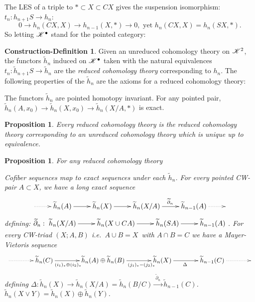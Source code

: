 \documentclass[11pt]{article}
\theoremstyle{plain}
\newtheorem{prop}[thm]{Proposition}
\theoremstyle{definition}
\newtheorem{condef}[thm]{Construction-Definition}
\begin{document}
{\noindent The LES of a triple to $*\subset X\subset CX$ gives the
suspension isomorphism: $t_n:h_{n+1}S\to h_n$:
\[0\to h_n(CX,X)\to h_{n-1}(X,*)\to0,\text{ \ yet \ }h_{n}(CX,X)=h_{n}(SX,*).\]
So letting $\mathscr{K}^\bullet$ stand for the pointed category:
\setcounter{thm}{3}
\begin{condef}
Given an unreduced cohomology theory on $\mathscr{K}^2$, the functors $\widetilde h_n$
induced on $\mathscr{K}^\bullet$ taken with the natural equivalences $t_n:\widetilde
h_{n+1}S\to\widetilde h_n$ are the \emph{reduced cohomology theory}
corresponding to $h_n$. The following properties of the $\widetilde h_n$ are the
axioms for a reduced cohomology theory:
\begin{itemise}
\itm The functors $\widetilde h_n$ are pointed homotopy invariant.
\itm For any pointed pair, 
$\widetilde h_n(A,x_0)\to\widetilde h_n(X,x_0)\to\widetilde h_n(X/A,*)$
is exact.
\end{itemise}
\end{condef}
\setcounter{thm}{5}
\begin{prop}
Every reduced cohomology theory is the reduced cohomology theory corresponding
to an unreduced cohomology theory which is unique up to equivalence.
\end{prop}
\begin{prop} For any reduced cohomology theory\upcol
\begin{itemise}
\itm Cofiber sequences map to exact sequences under each $\widetilde h_n$.
\itm For every pointed CW-pair $A\subset X$, we have a long exact sequence\upcol
\[\xymatrix{
\ar@{.>}[r]&
\widetilde h_n(A)\ar[r]&\widetilde h_{n}(X)\ar[r]&\widetilde h_{n}(X/A)
\ar[r]^{\widetilde\partial_n}&\widetilde h_{n-1}(A)\ar@{.>}[r]&
}\]
defining: $\widetilde\partial_n:\xymatrix{\widetilde h_n(X/A)\ar[r]&
\widetilde h_n(X\cup CA)\ar[r]&\widetilde h_n(SA)\ar[r]&\widetilde h_{n-1}(A)}$.
\itm For every CW-triad $(X;A,B)$ \lparen i.e.\ $A\cup B=X$\rparen\ with $A\cap
B=C$ we have a Mayer-Vietoris sequence\upcol
\[\xymatrix@C=1.3cm{
\ar@{.>}[r]&
\widetilde h_{n}(C)\ar[r]_{(i_1)_*\oplus (i_2)_*\ \ \ \ \ }&
\widetilde h_{n}(A)\oplus \widetilde h_n(B)\ar[r]_{\qquad \ \ (j_1)_*-(j_2)_*}&
\widetilde h_{n}(X)\ar[r]_{\Delta\ \ }&\widetilde h_{n-1}(C)\ar@{.>}[r]&
}\]
defining $\Delta:\widetilde h_n(X)\to \widetilde h_n(X/A)=\widetilde
h_n(B/C)\xrightarrow{\ \widetilde\partial_n\ }\widetilde h_{n-1}(C)$. 
\itm $\widetilde h_n(X\vee Y)=\widetilde h_n(X)\oplus\widetilde h_n(Y)$.
\end{itemise}
\end{prop}
}
\end{document}
